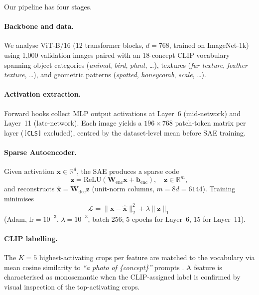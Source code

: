 Our pipeline has four stages.

\paragraph{Backbone and data.}
We analyse ViT-B/16 \cite{Dosovitskiy2021} (12 transformer blocks, $d{=}768$, trained on ImageNet-1k) using 1,000 validation images paired with an 18-concept CLIP vocabulary spanning object categories (\textit{animal}, \textit{bird}, \textit{plant}, \ldots), textures (\textit{fur texture}, \textit{feather texture}, \ldots), and geometric patterns (\textit{spotted}, \textit{honeycomb}, \textit{scale}, \ldots).

\paragraph{Activation extraction.}
Forward hooks collect MLP output activations at Layer~6 (mid-network) and Layer~11 (late-network). Each image yields a $196{\times}768$ patch-token matrix per layer (\texttt{[CLS]} excluded), centred by the dataset-level mean before SAE training.

\paragraph{Sparse Autoencoder.}
Given activation $\mathbf{x}\!\in\!\mathbb{R}^d$, the SAE produces a sparse code
\begin{equation}
  \mathbf{z} = \text{ReLU}(\mathbf{W}_\text{enc}\mathbf{x} + \mathbf{b}_\text{enc}),\quad \mathbf{z}\!\in\!\mathbb{R}^m,
\end{equation}
and reconstructs $\hat{\mathbf{x}} = \mathbf{W}_\text{dec}\mathbf{z}$ (unit-norm columns, $m{=}8d{=}6144$). Training minimises
\begin{equation}
  \mathcal{L} = \|\mathbf{x}-\hat{\mathbf{x}}\|_2^2 + \lambda\|\mathbf{z}\|_1
\end{equation}
(Adam, lr$\!=\!10^{-3}$, $\lambda\!=\!10^{-3}$, batch 256; 5 epochs for Layer~6, 15 for Layer~11).

\paragraph{CLIP labelling.}
The $K{=}5$ highest-activating crops per feature are matched to the vocabulary via mean cosine similarity to \textit{``a photo of \{concept\}''} prompts \cite{Radford2021}. A feature is characterised as monosemantic when the CLIP-assigned label is confirmed by visual inspection of the top-activating crops.

